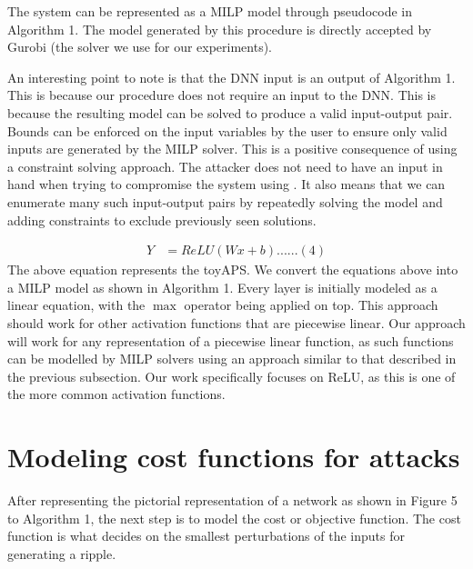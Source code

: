 The system can be represented as a MILP model through pseudocode in Algorithm 1. The model generated by this procedure is directly accepted by Gurobi (the solver we use for our experiments). %

An interesting point to note is that the DNN input is an output of Algorithm 1. This is because our procedure does not require an input to the DNN. This is because the resulting model can be solved to produce a valid input-output pair. Bounds can be enforced on the input variables by the user to ensure only
valid inputs are generated by the MILP solver. This is a positive consequence of using a constraint solving approach. The attacker does not need to have an input in hand when trying to compromise the system using \tool. It also means that we can enumerate many such input-output pairs by repeatedly solving the model
and adding constraints to exclude previously seen solutions.

\begin{align*}
Y &=  ReLU(Wx + b) ...... (4)
\end{align*}
The above equation represents the toyAPS. We convert the equations above into a MILP model as shown in Algorithm 1. Every layer is initially modeled as a linear equation, with the $\max$ operator being applied on top. This approach should work for other activation functions that are piecewise linear. Our approach will work for any representation of a piecewise linear function, as such functions can be modelled by MILP solvers using an approach similar to that described in the previous subsection. Our work specifically focuses on ReLU, as this is one of the more common activation functions.
\section{Modeling cost functions for attacks}
\label{section:costfunction}
After representing the pictorial representation of a network as shown in Figure 5 to Algorithm 1, the next step is to model the cost or objective function. The cost function is what decides on the smallest perturbations of the inputs for generating a ripple. 

